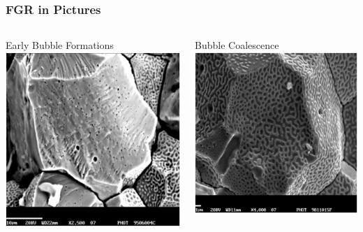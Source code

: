 \begin{frame}
\frametitle{FGR in Pictures}

\begin{columns}
 \begin{column}{0.5\textwidth}
  \centering
  Early Bubble Formations 
  \includegraphics[width=1.\textwidth]{./fgr_3.png}
 \end{column}
 \begin{column}{0.5\textwidth}
  \centering
  Bubble Coalescence
  \includegraphics[width=1.\textwidth]{./fgr_2.png}
 \end{column}
\end{columns}


\end{frame}
